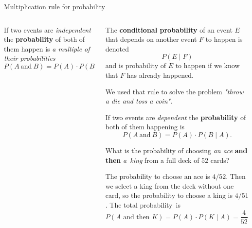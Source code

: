\documentclass[9pt,aspectratio=169]{beamer}
\begin{document}
\begin{frame}{Multiplication rule for probability}
\begin{columns}[T]
\begin{column}{0.5\textwidth}
      \begin{definition}
        If two events are \emph{independent} the \textbf{probability} of both of them happen is \emph{a multiple of their probabilities}
        \[ P (A\ \text{and}\ B) = P (A) \cdot P (B). \] 
        \vspace*{-2ex} 
      \end{definition}
    \end{column}
    \begin{column}{0.5\textwidth}
      \begin{definition}
        The \textbf{conditional probability} of an event $E$ that depends on another event $F$ to happen is denoted 
        \[ P(E \mid F) \]
        and is probability of $E$ to happen if we know that $F$ has already happened.
      \end{definition}
      {\small We used that rule to solve the problem \emph{"throw a die and toss a coin"}.}
      \begin{definition}
        If two events are \emph{dependent} the \textbf{probability} of both of them happening is
        \[ P (A\ \text{and}\ B) = P (A) \cdot P (B \mid A). \] 
        \vspace*{-2.5ex} 
      \end{definition}
      {\small
        \begin{problem}
          What is the probability of choosing \emph{an ace} \textbf{and then} \emph{a~king} from a full deck of $52$ cards?
        \end{problem}
        The probability to choose an ace is $4/52$. Then we select a king from the deck without one card, so the probability to choose a king is $4/51$. The total probability~is
        \[ P(A \text{ and then } K) = P(A) \cdot P(K \mid A) = \frac{4}{52} \cdot \frac{4}{51} = \frac{4}{663}. \]
      }
    \end{column}
  \end{columns}
\end{frame}
\end{document}
